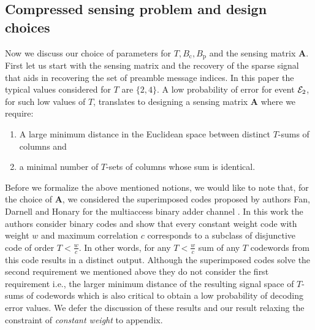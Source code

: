 \subsection{Compressed sensing problem and design choices}
Now we discuss our choice of parameters for $T, B_\mathrm{c}, B_\mathrm{p}$ and the sensing matrix $\mathbf{A}$. First let us start with the sensing matrix and the recovery of the sparse signal that aids in recovering the set of preamble message indices. In this paper the typical values considered for $T$  are $\{2,4\}$. A low probability of error for event $\mathcal{E}_2$, for such low values of $T$, translates to  designing a sensing matrix $\mathbf{A}$ where we require: 
\begin{enumerate}
\item A large minimum distance in the Euclidean space between distinct $T$-sums of columns and 
\item a minimal number of $T$-sets of columns whose sum is identical.
\end{enumerate} 
Before we formalize the above mentioned notions, we would like to note that, for the choice of $\mathbf{A}$, we considered the superimposed codes proposed by authors Fan, Darnell and Honary for the multiaccess binary adder channel \cite{fan1995superimposed}. In this work the authors consider binary codes and show that every constant weight code with weight $w$ and maximum correlation $c$ corresponds to a subclass of disjunctive code of order $T<\frac{w}{c}$. In other words, for any $T<\frac{w}{c}$ sum of any $T$ codewords from this code results in a distinct output. Although the superimposed codes solve the second requirement we mentioned above they do not consider the first requirement i.e., the larger minimum distance of the resulting signal space of $T$-sums of codewords which is also critical to obtain a low probability of decoding error values. We defer the discussion of these results and our result relaxing the constraint of \textit{constant weight} to appendix.

